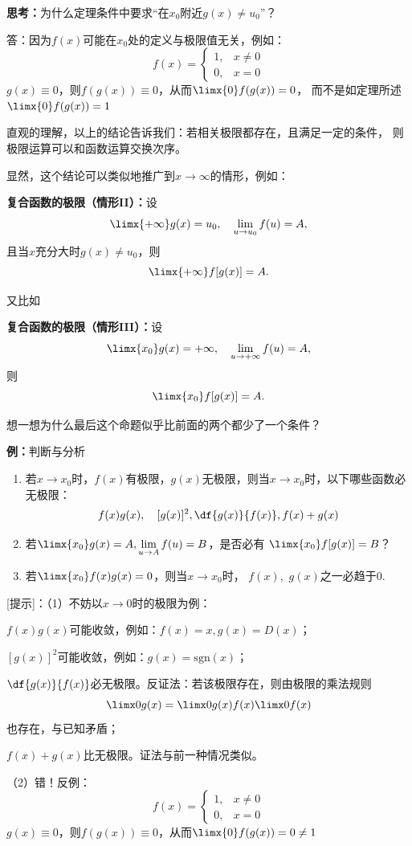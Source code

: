 {\bf 思考：}为什么定理条件中要求“在$x_0$附近$g(x)\ne u_0$”？
  
  答：因为$f(x)$可能在$x_0$处的定义与极限值无关，例如：
  $$f(x)=\left\{\begin{array}{ll}
  1,&x\ne0\\0,&x=0
  \end{array}\right.$$
  $g(x)\equiv 0$，则$f(g(x))\equiv0$，从而$\limx{0}f(g(x))=0$，
  而不是如定理所述$\limx{0}f(g(x))=1$

直观的理解，以上的结论告诉我们：若相关极限都存在，且满足一定的条件，
则极限运算可以和函数运算交换次序。

显然，这个结论可以类似地推广到$x\to\infty$的情形，例如：

\begin{thx}
	{\bf 复合函数的极限（情形II）：}设
	$$\limx{+\infty}g(x)=u_0,\quad\lim\limits_{u\to u_0}f(u)=A,$$
	且当$x$充分大时$g(x)\ne u_0$，则
	$$\limx{+\infty}f[g(x)]=A.$$
\end{thx}
又比如
\begin{thx}
	{\bf 复合函数的极限（情形III）：}设
	$$\limx{x_0}g(x)=+\infty,\quad\lim\limits_{u\to+\infty}f(u)=A,$$
	则
	$$\limx{x_0}f[g(x)]=A.$$
\end{thx}
想一想为什么最后这个命题似乎比前面的两个都少了一个条件？

{\bf 例：}判断与分析
\begin{enumerate}[(1)]
  \setlength{\itemindent}{1cm}
  \item 若$x\to x_0$时，$f(x)$有极限，$g(x)$无极限，则当$x\to x_0$时，以下哪些函数必无极限：
  $$f(x)g(x),\quad [g(x)]^2,\df{g(x)}{f(x)}, f(x)+g(x)$$ 
  \item 若$\limx{x_0}g(x)=A,\lim\limits_{u\to A}f(u)=B$，是否必有
  $\limx{x_0}f[g(x)]=B$？
  \item 若$\limx{x_0}f(x)g(x)=0$，则当$x\to
  x_0$时， $f(x),$ $g(x)$之一必趋于$0$.
\end{enumerate}

[提示]：（1）不妨以$x\to0$时的极限为例：

$f(x)g(x)$可能收敛，例如：$f(x)=x,g(x)=D(x)$；

$[g(x)]^2$可能收敛，例如：$g(x)=\mathrm{sgn}(x)$；

$\df{g(x)}{f(x)}$必无极限。反证法：若该极限存在，则由极限的乘法规则
$$\limx0g(x)=\limx0{g(x)}{f(x)}\limx0f(x)$$
也存在，与已知矛盾；

$f(x)+g(x)$比无极限。证法与前一种情况类似。

（2）错！反例：
$$f(x)=\left\{\begin{array}{ll}
  1,&x\ne0\\0,&x=0
\end{array}\right.$$
$g(x)\equiv 0$，则$f(g(x))\equiv0$，从而$\limx{0}f(g(x))=0\ne 1$

